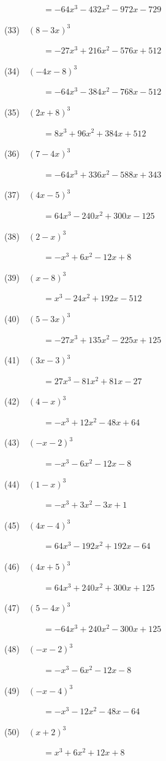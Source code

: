 \documentclass[a4j,twocolumn,10pt,fleqn]{jarticle}
\begin{document}
~~~~~~~~~$=- 64 x^{3} - 432 x^{2} - 972 x - 729$

(33)~~$\left(8 - 3 x\right)^{3}$

~~~~~~~~~$=- 27 x^{3} + 216 x^{2} - 576 x + 512$

(34)~~$\left(- 4 x - 8\right)^{3}$

~~~~~~~~~$=- 64 x^{3} - 384 x^{2} - 768 x - 512$

(35)~~$\left(2 x + 8\right)^{3}$

~~~~~~~~~$=8 x^{3} + 96 x^{2} + 384 x + 512$

(36)~~$\left(7 - 4 x\right)^{3}$

~~~~~~~~~$=- 64 x^{3} + 336 x^{2} - 588 x + 343$

(37)~~$\left(4 x - 5\right)^{3}$

~~~~~~~~~$=64 x^{3} - 240 x^{2} + 300 x - 125$

(38)~~$\left(2 - x\right)^{3}$

~~~~~~~~~$=- x^{3} + 6 x^{2} - 12 x + 8$

(39)~~$\left(x - 8\right)^{3}$

~~~~~~~~~$=x^{3} - 24 x^{2} + 192 x - 512$

(40)~~$\left(5 - 3 x\right)^{3}$

~~~~~~~~~$=- 27 x^{3} + 135 x^{2} - 225 x + 125$

(41)~~$\left(3 x - 3\right)^{3}$

~~~~~~~~~$=27 x^{3} - 81 x^{2} + 81 x - 27$

(42)~~$\left(4 - x\right)^{3}$

~~~~~~~~~$=- x^{3} + 12 x^{2} - 48 x + 64$

(43)~~$\left(- x - 2\right)^{3}$

~~~~~~~~~$=- x^{3} - 6 x^{2} - 12 x - 8$

(44)~~$\left(1 - x\right)^{3}$

~~~~~~~~~$=- x^{3} + 3 x^{2} - 3 x + 1$

(45)~~$\left(4 x - 4\right)^{3}$

~~~~~~~~~$=64 x^{3} - 192 x^{2} + 192 x - 64$

(46)~~$\left(4 x + 5\right)^{3}$

~~~~~~~~~$=64 x^{3} + 240 x^{2} + 300 x + 125$

(47)~~$\left(5 - 4 x\right)^{3}$

~~~~~~~~~$=- 64 x^{3} + 240 x^{2} - 300 x + 125$

(48)~~$\left(- x - 2\right)^{3}$

~~~~~~~~~$=- x^{3} - 6 x^{2} - 12 x - 8$

(49)~~$\left(- x - 4\right)^{3}$

~~~~~~~~~$=- x^{3} - 12 x^{2} - 48 x - 64$

(50)~~$\left(x + 2\right)^{3}$

~~~~~~~~~$=x^{3} + 6 x^{2} + 12 x + 8$
\end{document}
